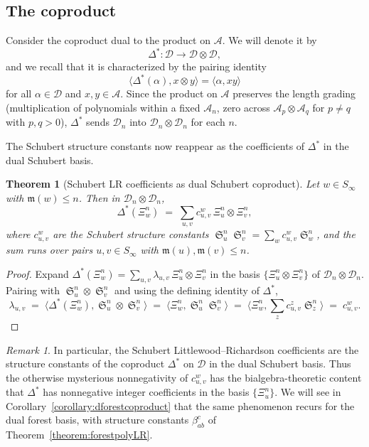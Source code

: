 \documentclass[a4paper,fleqn]{cas-sc}
\newtheorem{theorem}{Theorem}[section]
\theoremstyle{definition}
\theoremstyle{remark}
\newtheorem*{remark}{Remark}
\numberwithin{equation}{subsection}
\DeclareMathOperator{\sch}{\mathfrak{S}}
\newcommand{\dsch}{\ensuremath{\Xi}}
\newcommand{\coma}{\mathcal{A}}
\newcommand{\dcoma}{\mathcal{D}}
\newcommand{\maxd}{\mathfrak{m}}
\begin{document}
\subsection{The coproduct}

Consider the coproduct dual to the product on $\coma$. We will denote it by
$$\Delta^*:\dcoma\to \dcoma\otimes\dcoma,$$
and we recall that it is characterized by the pairing identity
$$\langle \Delta^*(\alpha), x\otimes y\rangle = \langle \alpha, xy\rangle$$
for all $\alpha\in\dcoma$ and $x,y\in\coma$. Since the product on $\coma$ preserves the length grading (multiplication of polynomials within a fixed $\coma_n$, zero across $\coma_p\otimes\coma_q$ for $p\neq q$ with $p,q>0$), $\Delta^*$ sends $\dcoma_n$ into $\dcoma_n\otimes\dcoma_n$ for each $n$.

The Schubert structure constants now reappear as the coefficients of $\Delta^*$ in the dual Schubert basis.

\begin{theorem}[Schubert LR coefficients as dual Schubert coproduct]\label{theorem:dschcoproduct}
Let $w\in S_\infty$ with $\maxd(w)\leq n$. Then in $\dcoma_n\otimes\dcoma_n$,
$$\Delta^*(\dsch_w^n) \;=\; \sum_{u,v} c_{u,v}^w\, \dsch_u^n\otimes \dsch_v^n,$$
where $c_{u,v}^w$ are the Schubert structure constants $\sch_u^n\sch_v^n=\sum_w c_{u,v}^w\sch_w^n$, and the sum runs over pairs $u,v\in S_\infty$ with $\maxd(u),\maxd(v)\leq n$.
\end{theorem}
\begin{proof}
Expand $\Delta^*(\dsch_w^n) = \sum_{u,v}\lambda_{u,v}\,\dsch_u^n\otimes\dsch_v^n$ in the basis $\{\dsch_u^n\otimes\dsch_v^n\}$ of $\dcoma_n\otimes\dcoma_n$. Pairing with $\sch_u^n\otimes\sch_v^n$ and using the defining identity of $\Delta^*$,
$$\lambda_{u,v}\;=\;\langle \Delta^*(\dsch_w^n), \sch_u^n\otimes\sch_v^n\rangle\;=\;\langle \dsch_w^n,\sch_u^n\sch_v^n\rangle\;=\;\langle \dsch_w^n,\textstyle\sum_z c_{u,v}^z \sch_z^n\rangle\;=\;c_{u,v}^w.$$
\end{proof}

\begin{remark}
In particular, the Schubert Littlewood--Richardson coefficients are the structure constants of the coproduct $\Delta^*$ on $\dcoma$ in the dual Schubert basis. Thus the otherwise mysterious nonnegativity of $c_{u,v}^w$ has the bialgebra-theoretic content that $\Delta^*$ has nonnegative integer coefficients in the basis $\{\dsch_u^n\}$. We will see in Corollary~\ref{corollary:dforestcoproduct} that the same phenomenon recurs for the dual forest basis, with structure constants $\beta_{ab}^c$ of Theorem~\ref{theorem:forestpolyLR}.
\end{remark}
\end{document}
